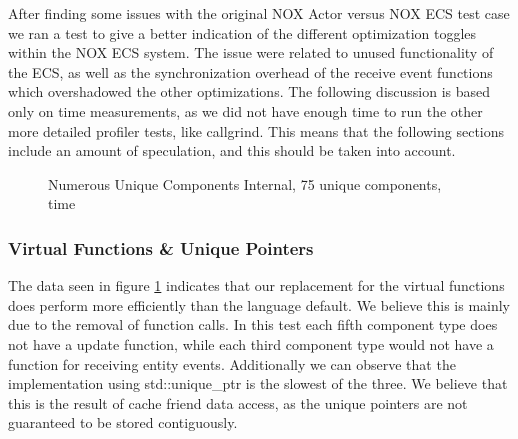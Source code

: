 After finding some issues with the original NOX Actor versus NOX ECS test case we ran a test to give a better indication of
the different optimization toggles within the NOX ECS system.
The issue were related to unused functionality of the ECS, as well as the synchronization overhead of the receive event functions
which overshadowed the other optimizations.
The following discussion is based only on time measurements, as we did not have enough time to
run the other more detailed profiler tests, like callgrind.
This means that the following sections include an amount of speculation, and this should be taken into account.


\begin{figure}[htb]
\centering
{}
\caption{Numerous Unique Components Internal, 75 unique components, time}
\label{fig:benchmarking_numerous_unique_75_internal_time_virtual}
\end{figure}

\todo{Ask simon if we should use logscale for the graphs}
\subsubsection{Virtual Functions \& Unique Pointers}
The data seen in figure \ref{fig:benchmarking_numerous_unique_75_internal_time_virtual} indicates that our replacement for the virtual functions
does perform more efficiently than the language default.
We believe this is mainly due to the removal of function calls.
In this test each fifth component type does not have a update function, while each third component type would not have a function
for receiving entity events.
Additionally we can observe that the implementation using std::unique\_ptr is the slowest of the three.
We believe that this is the result of cache friend data access, as the unique pointers are not guaranteed to be stored contiguously.

